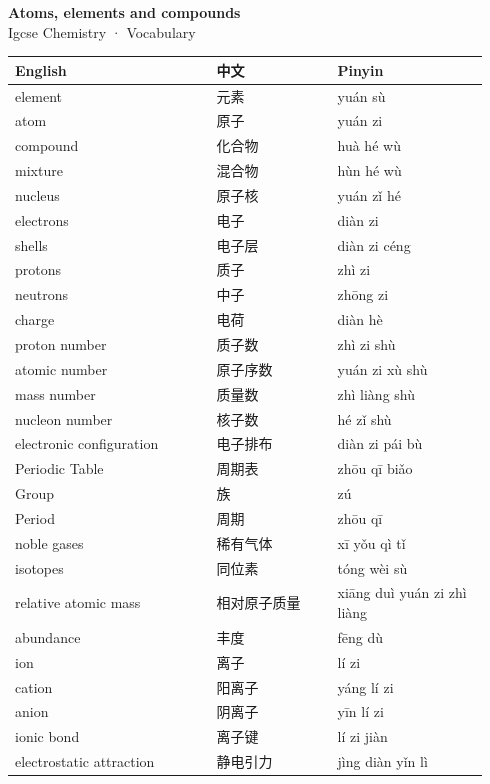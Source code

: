 \documentclass[11pt]{article}
\begin{document}
\begin{center}
  {\LARGE\bfseries Atoms, elements and compounds}\\[0.35em]
  {\large Igcse Chemistry · Vocabulary}
\end{center}
\vspace{0.6em}

\begin{longtable}{@{}p{0.40\linewidth}p{0.24\linewidth}p{0.30\linewidth}@{}}
\toprule
\textbf{English} & \textbf{中文} & \textbf{Pinyin} \\
\midrule
\endhead
\bottomrule
\endlastfoot
element & 元素 & yuán sù \\
atom & 原子 & yuán zi \\
compound & 化合物 & huà hé wù \\
mixture & 混合物 & hùn hé wù \\
nucleus & 原子核 & yuán zǐ hé \\
electrons & 电子 & diàn zi \\
shells & 电子层 & diàn zi céng \\
protons & 质子 & zhì zi \\
neutrons & 中子 & zhōng zi \\
charge & 电荷 & diàn hè \\
proton number & 质子数 & zhì zi shù \\
atomic number & 原子序数 & yuán zi xù shù \\
mass number & 质量数 & zhì liàng shù \\
nucleon number & 核子数 & hé zǐ shù \\
electronic configuration & 电子排布 & diàn zi pái bù \\
Periodic Table & 周期表 & zhōu qī biǎo \\
Group & 族 & zú \\
Period & 周期 & zhōu qī \\
noble gases & 稀有气体 & xī yǒu qì tǐ \\
isotopes & 同位素 & tóng wèi sù \\
relative atomic mass & 相对原子质量 & xiāng duì yuán zi zhì liàng \\
abundance & 丰度 & fēng dù \\
ion & 离子 & lí zi \\
cation & 阳离子 & yáng lí zi \\
anion & 阴离子 & yīn lí zi \\
ionic bond & 离子键 & lí zi jiàn \\
electrostatic attraction & 静电引力 & jìng diàn yǐn lì \\

\end{longtable}
\end{document}
